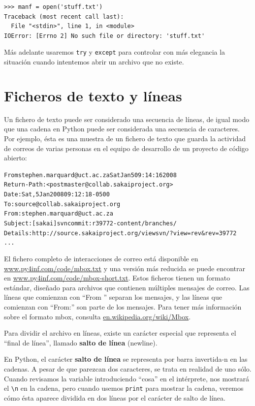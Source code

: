 \beforeverb
\begin{verbatim}
>>> manf = open('stuff.txt')
Traceback (most recent call last):
  File "<stdin>", line 1, in <module>
IOError: [Errno 2] No such file or directory: 'stuff.txt'
\end{verbatim}
\afterverb
%
Más adelante usaremos {\tt try} y {\tt except} para controlar con más
elegancia la situación cuando intentemos abrir un archivo
que no existe.

\section{Ficheros de texto y líneas}

Un fichero de texto puede ser considerado una secuencia de líneas, de igual
modo que una cadena en Python puede ser considerada una secuencia de caracteres.
Por ejemplo, ésta es una muestra de un fichero de texto que guarda la actividad de correos
de varias personas en el equipo de desarrollo de un proyecto de código abierto:

\beforeverb
\begin{alltt}
From stephen.marquard@uct.ac.za Sat Jan  5 09:14:16 2008
Return-Path: <postmaster@collab.sakaiproject.org>
Date: Sat, 5 Jan 2008 09:12:18 -0500
To: source@collab.sakaiproject.org
From: stephen.marquard@uct.ac.za
Subject: [sakai] svn commit: r39772 - content/branches/
Details: http://source.sakaiproject.org/viewsvn/?view=rev\&rev=39772
...
\end{alltt}
\afterverb

El fichero completo de interacciones de correo está disponible en
\url{www.py4inf.com/code/mbox.txt} 
y una versión más reducida se puede encontrar en
\url{www.py4inf.com/code/mbox-short.txt}.
Estos ficheros tienen un formato estándar, diseñado para archivos que contienen
múltiples mensajes de correo. Las líneas que comienzan con
``From '' separan los mensajes, y las líneas que comienzan con
``From:'' son parte de los mensajes.
Para tener más información sobre el formato mbox, consulta
\url{en.wikipedia.org/wiki/Mbox}. 

Para dividir el archivo en líneas, existe un carácter especial que
representa el ``final de línea'', llamado {\bf salto de línea} (newline).

En Python, el carácter {\bf salto de línea} se representa por barra invertida-n en
las cadenas. A pesar de que parezcan dos caracteres, se
trata en realidad de uno sólo. Cuando revisamos la variable introduciendo
``cosa'' en el intérprete, nos mostrará el \verb"\n" en la cadena,
pero cuando usemos {\tt print} para mostrar la cadena, veremos cómo ésta
aparece dividida en dos líneas por el carácter de salto de línea.

